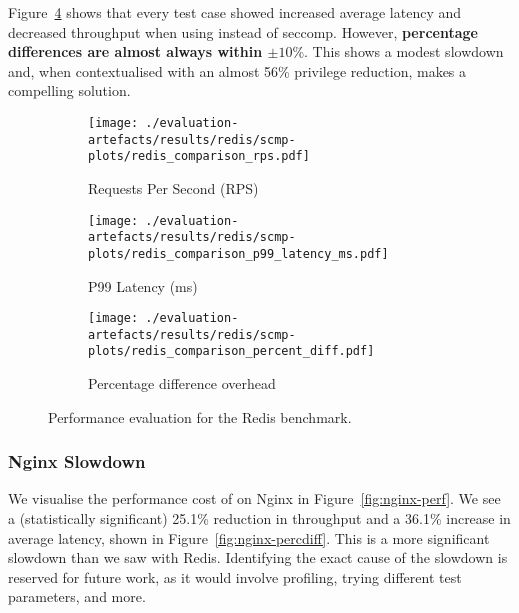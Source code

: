 Figure~\ref{fig:redis-perf} shows that every test case showed increased
average latency and decreased throughput when using \af instead of seccomp.
However, \textbf{percentage differences are almost always within $\pm 10\%$}.
This shows a modest slowdown and, when contextualised with an almost 56\%
privilege reduction, makes \af a compelling solution.

\begin{figure}[htbp]
    \centering
    \begin{subfigure}[b]{\textwidth}
        \centering
        \texttt{[image: ./evaluation-artefacts/results/redis/scmp-plots/redis\_comparison\_rps.pdf]} 
        \caption{Requests Per Second (RPS)}
        \label{fig:redis-rps}
    \end{subfigure}
    \hfill
     \begin{subfigure}[b]{\textwidth}
        \centering
        \texttt{[image: ./evaluation-artefacts/results/redis/scmp-plots/redis\_comparison\_p99\_latency\_ms.pdf]} 
        \caption{P99 Latency (ms)}
        \label{fig:redis-p99}
    \end{subfigure}
    
     \medskip 
     \begin{subfigure}[b]{1.2\textwidth}
        \centering
        \texttt{[image: ./evaluation-artefacts/results/redis/scmp-plots/redis\_comparison\_percent\_diff.pdf]} %
        \caption{Percentage difference overhead}
        \label{fig:redis-percdiff}
    \end{subfigure}

    \caption{Performance evaluation for the Redis benchmark.}
    \label{fig:redis-perf}
\end{figure}

\subsubsection{Nginx Slowdown}\label{subsubsec:nginx-slowdown}

We visualise the performance cost of \af on Nginx in
Figure~\ref{fig:nginx-perf}. We see a (statistically significant) 25.1\%
reduction in throughput and a 36.1\% increase in average latency, shown in
Figure~\ref{fig:nginx-percdiff}. This is a more significant slowdown than
we saw with Redis. Identifying the exact cause of the slowdown is reserved
for future work, as it would involve profiling, trying different test
parameters, and more. 

